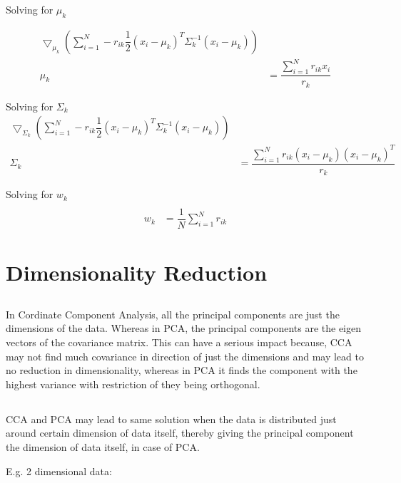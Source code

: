 \documentclass[paper=a4, fontsize=11pt]{scrartcl} %
\numberwithin{equation}{section} %
\numberwithin{figure}{section} %
\numberwithin{table}{section} %
\begin{document}
Solving for $\mu_{k}$

\begin{align*} 
\bigtriangledown_{ \mu_{k}} (\sum_{i=1}^{N} -r_{ik}\dfrac{1}{2}(x_{i}-\mu_{k})^{T}\Sigma_{k}^{-1} (x_{i}-\mu_{k}))\\
\mu_{k} &= \dfrac{\sum_{i=1}^{N}r_{ik}x_{i}}{r_{k}}
\end{align*}

Solving for $\Sigma_{k}$
\begin{align*} 
\bigtriangledown_{\Sigma_{k}} (\sum_{i=1}^{N} -r_{ik}\dfrac{1}{2}(x_{i}-\mu_{k})^{T}\Sigma_{k}^{-1} (x_{i}-\mu_{k}))\\
\Sigma_{k} &= \dfrac{\sum_{i=1}^{N}r_{ik}(x_{i}-\mu_{k})(x_{i}-\mu_{k})^{T}}{r_{k}}
\end{align*}


Solving for $w_{k}$
\begin{align*} \\
w_{k} &= \dfrac{1}{N}\sum_{i=1}^{N}r_{ik}
\end{align*}


\section{Dimensionality Reduction}
\subsection{}
In Cordinate Component Analysis, all the principal components are just the dimensions of the data. Whereas in PCA, the principal components are the eigen vectors of the covariance matrix. This can have a serious impact because, CCA may not find much covariance in direction of just the dimensions and may lead to no reduction in dimensionality, whereas in PCA it finds the component with the highest variance with restriction of they being orthogonal.

\subsection{}
CCA and PCA may lead to same solution when the data is distributed just around certain dimension of data itself, thereby giving the principal component the dimension of data itself, in case of PCA.

E.g. 2 dimensional data:
\end{document}
